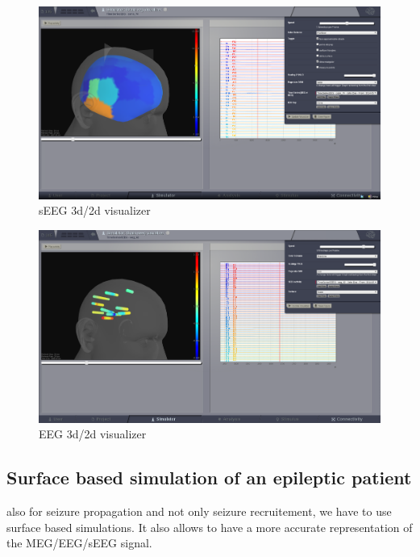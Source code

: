 \documentclass{tufte-handout}
\begin{document}
\begin{figure}[h]
  \includegraphics[width=\linewidth]{Handout_UI_ModellingAnEpilepticPatient_EEG3d2dBrainVisualizer}%
  \caption{sEEG 3d/2d visualizer}%
  \label{fig:sEEG}%
\end{figure}

\begin{figure}[h]
  \includegraphics[width=\linewidth]{Handout_UI_ModellingAnEpilepticPatient_sEEG3d2dBrainVisualizer}%
  \caption{EEG 3d/2d visualizer}%
  \label{fig:EEG}%
\end{figure} 

\subsection{Surface based simulation of an epileptic patient}

  also for seizure propagation and not only seizure recruitement, we have to use surface based simulations.
 It also allows to have a more accurate representation of the MEG/EEG/sEEG signal.
 
\end{document}
